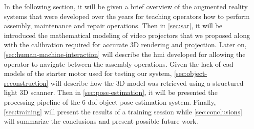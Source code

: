 In the following section, it will be given a brief overview of the augmented reality systems that were developed over the years for teaching operators how to perform assembly, maintenance and repair operations. Then in \cref{sec:sar}, it will be introduced the mathematical modeling of video projectors that we proposed along with the calibration required for accurate 3D rendering and projection. Later on, \cref{sec:human-machine-interaction} will describe the \gls{hmi} developed for allowing the operator to navigate between the assembly operations. Given the lack of \gls{cad} models of the starter motor used for testing our system, \cref{sec:object-reconstruction} will describe how the 3D model was retrieved using a structured light 3D scanner. Then in \cref{sec:pose-estimation}, it will be presented the processing pipeline of the 6 \gls{dof} object pose estimation system. Finally, \cref{sec:training} will present the results of a training session while \cref{sec:conclusions} will summarize the conclusions and present possible future work.

